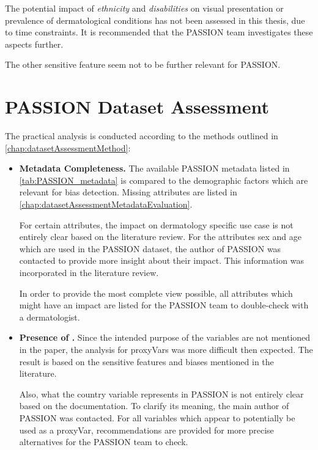 \documentclass[12pt, a4paper, oneside]{book}   	%
\begin{document}
			The potential impact of \textit{ethnicity} and \textit{disabilities} on visual presentation or prevalence of dermatological conditions has not been assessed in this thesis, due to time constraints. It is recommended that the PASSION team investigates these aspects further.
			
			The other sensitive feature seem not to be further relevant for PASSION.
			
		\section{PASSION Dataset Assessment} \label{chap:datasetAssessmentExecution}
		The practical analysis is conducted according to the methods outlined in \autoref{chap:datasetAssessmentMethod}:
		
		\begin{itemize}
			\item \textbf{Metadata Completeness.}
			The available PASSION metadata listed in \autoref{tab:PASSION_metadata} is compared to the demographic factors which are relevant for bias detection. Missing attributes are listed in \autoref{chap:datasetAssessmentMetadataEvaluation}.
			
			For certain attributes, the impact on dermatology specific use case is not entirely clear based on the literature review. For the attributes sex and age which are used in the PASSION dataset, the author of PASSION was contacted to provide more insight about their impact. This information was incorporated in the literature review.
			
			In order to provide the most complete view possible, all attributes which might have an impact are listed for the PASSION team to double-check with a dermatologist.
			
			\item \textbf{Presence of .}
			Since the intended purpose of the variables are not mentioned in the paper, the analysis for \glspl{proxyVar} was more difficult then expected. The result is based on the sensitive features and biases mentioned in the literature.
			
			Also, what the country variable represents in PASSION is not entirely clear based on the documentation. To clarify its meaning, the main author of PASSION was contacted.
			For all variables which appear to potentially be used as a \gls{proxyVar}, recommendations are provided for more precise alternatives for the PASSION team to check.
			

\end{itemize}
\end{document}
